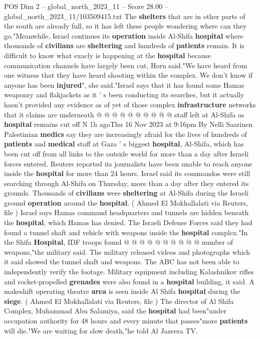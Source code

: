 \begin{textsample}{POS Dim 2 – global\_north\_2023\_11 – Score 28.00 – global\_north\_2023\_11/103509415.txt}
The \textbf{shelters} that are in other parts of the south are already full, so it has left these people wondering where can they go."Meanwhile, Israel continues its \textbf{operation} inside Al-Shifa \textbf{hospital} where thousands of \textbf{civilians} are \textbf{sheltering} and hundreds of \textbf{patients} remain.
It is difficult to know what exacly is happening at the \textbf{hospital} because communication channels have largely been cut, Horn said."We have heard from one witness that they have heard shooting within the complex.
We don't know if anyone has been \textbf{injured}", she said."Israel says that it has found some Hamas weaponry and flakjackets as it ' s been conducting its searches, but it actually hasn't provided any evidence as of yet of those complex \textbf{infrastructure} networks that it claims are underneath @ @ @ @ @ @ @ @ @ @ staff left at Al-Shifa as \textbf{hospital} remains cut off N 1h agoThu 16 Nov 2023 at 9:16pm By Nelli Saarinen Palestinian \textbf{medics} say they are increasingly afraid for the lives of hundreds of \textbf{patients} and \textbf{medical} staff at Gaza ' s biggest \textbf{hospital}, Al-Shifa, which has been cut off from all links to the outside world for more than a day after Israeli forces entered.
Reuters reported its journalists have been unable to reach anyone inside the \textbf{hospital} for more than 24 hours.
Israel said its commandos were still searching through Al-Shifa on Thursday, more than a day after they entered its grounds.
Thousands of \textbf{civilians} were \textbf{sheltering} at Al-Shifa during the Israeli ground \textbf{operation} around the \textbf{hospital}. ( Ahmed El Mokhallalati via Reuters, file ) Israel says Hamas command headquarters and tunnels are hidden beneath the \textbf{hospital}, which Hamas has denied.
The Israeli Defense Forces said they had found a tunnel shaft and vehicle with weapons inside the \textbf{hospital} complex."In the Shifa \textbf{Hospital}, IDF troops found @ @ @ @ @ @ @ @ @ @ number of weapons,"the military said.
The military released videos and photographs which it said showed the tunnel shaft and weapons.
The ABC has not been able to independently verify the footage.
Military equipment including Kalashnikov rifles and rocket-propelled \textbf{grenades} were also found in a \textbf{hospital} building, it said.
A makeshift operating theatre \textbf{area} is seen inside Al Shifa \textbf{hospital} during the \textbf{siege}. ( Ahmed El Mokhallalati via Reuters, file ) The director of Al Shifa Complex, Muhammad Abu Salamiya, said the \textbf{hospital} had been"under occupation authority for 48 hours and every minute that passes"more \textbf{patients} will die."We are waiting for slow death,"he told Al Jazeera TV.

\end{textsample}
